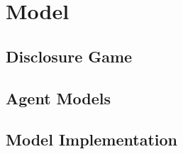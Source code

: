 \section{Model}
\label{sec:model}

\subsection{Disclosure Game}
\label{sub:the_game}

\subsection{Agent Models}
\label{sub:the_agents}

\subsection{Model Implementation}
\label{sub:the_code}